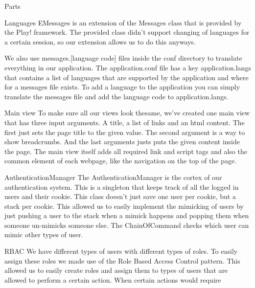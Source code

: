 \documentclass[]{article}
\begin{document}
\begin{section}{Parts}
    \begin{subsection}{Languages}
        EMessages is an extension of the Messages class that is provided by the Play!
        framework. The provided class didn't support changing of languages for a certain
        session, so our extension allows us to do this anyways.
        
        We also use messages.[language code] files inside the conf directory to translate
        everything in our application. The application.conf file has a key application.langs
        that contains a list of languages that are supported by the application and
        where for a messages file exists. To add a language to the application you can simply
        translate the messages file and add the language code to application.langs.
    \end{subsection}
    \begin{subsection}{Main view}
        To make sure all our views look thesame, we've created one main view that has three
        input arguments. A title, a list of links and an html content. The first just sets
        the page title to the given value. The second argument is a way to show breadcrumbs.
        And the last arguments justs puts the given content inside the page.
        The main view itself adds all required link and script tags and also the common
        element of each webpage, like the navigation on the top of the page.
    \end{subsection}
    \begin{subsection}{AuthenticationManager}
        The AuthenticationManager is the cortex of our authentication system. This is a
        singleton that keeps track of all the logged in users and their cookie.
        This class doesn't just save one user per cookie, but a stack per cookie. This
        allowed us to easily implement the mimicking of users by just pushing a user to
        the stack when a mimick happens and popping them when someone un-mimicks someone
        else.
        The ChainOfCommand checks which user can mimic other types of user.
    \end{subsection}
    \begin{subsection}{RBAC}
        We have different types of users with different types of roles. To easily
        assign these roles we made use of the Role Based Access Control pattern.
        This allowed us to easily create roles and assign them to types of users
        that are allowed to perform a certain action. When certain actions would require

\end{subsection}
\end{section}
\end{document}
